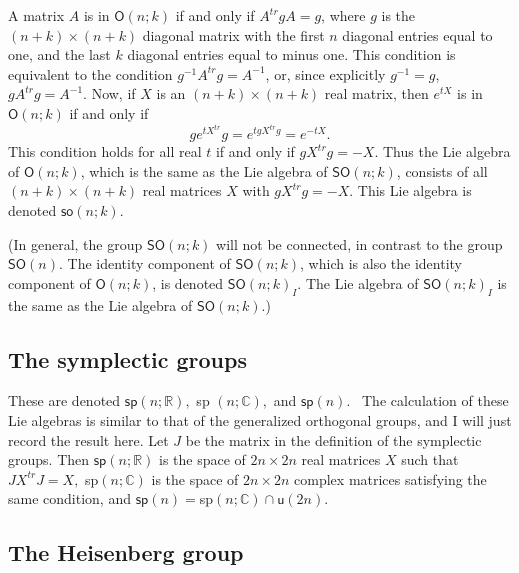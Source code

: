 \documentclass{amsbook}
\theoremstyle{plain}
\numberwithin{equation}{chapter}
\numberwithin{theorem}{chapter}
\begin{document}
A matrix $A$ is in $\mathsf{O}(n;k)$ if and only if $A^{tr}gA=g$, where $g$ is
the $(n+k)\times(n+k)$ diagonal matrix with the first $n$ diagonal entries
equal to one, and the last $k$ diagonal entries equal to minus one. This
condition is equivalent to the condition $g^{-1}A^{tr}g=A^{-1}$, or, since
explicitly $g^{-1}=g$, $gA^{tr}g=A^{-1}$. Now, if $X$ is an $(n+k)\times(n+k)$
real matrix, then $e^{tX}$ is in $\mathsf{O}(n;k)$ if and only if
\[
ge^{tX^{tr}}g=e^{tgX^{tr}g}=e^{-tX}\text{.}%
\]
This condition holds for all real $t$ if and only if $gX^{tr}g=-X$. Thus the
Lie algebra of $\mathsf{O}(n;k)$, which is the same as the Lie algebra of
$\mathsf{SO}(n;k)$, consists of all $(n+k)\times(n+k)$ real matrices $X$ with
$gX^{tr}g=-X$. This Lie algebra is denoted $\mathsf{so}(n;k)$.

(In general, the group $\mathsf{SO}(n;k)$ will not be connected, in contrast
to the group $\mathsf{SO}(n)$. The identity component of $\mathsf{SO}(n;k)$,
which is also the identity component of $\mathsf{O}(n;k)$, is denoted
$\mathsf{SO}(n;k)_{I}$. The Lie algebra of $\mathsf{SO}(n;k)_{I}$ is the same
as the Lie algebra of $\mathsf{SO}(n;k)$.)

\subsection{The symplectic groups}

These are denoted $\mathsf{sp}\left(  n;\mathbb{R}\right)  ,$ \textsf{sp}%
$\left(  n;\mathbb{C}\right)  ,$ and $\mathsf{sp}\left(  n\right)  .$ \ The
calculation of these Lie algebras is similar to that of the generalized
orthogonal groups, and I will just record the result here. Let $J$ be the
matrix in the definition of the symplectic groups. Then $\mathsf{sp}\left(
n;\mathbb{R}\right)  $ is the space of $2n\times2n$ real matrices $X$ such
that $JX^{tr}J=X,$ \textsf{sp}$\left(  n;\mathbb{C}\right)  $ is the space of
$2n\times2n$ complex matrices satisfying the same condition, and
$\mathsf{sp}\left(  n\right)  =$\textsf{sp}$\left(  n;\mathbb{C}\right)
\cap\mathsf{u}\left(  2n\right)  .$

\subsection{The Heisenberg group}
\end{document}
